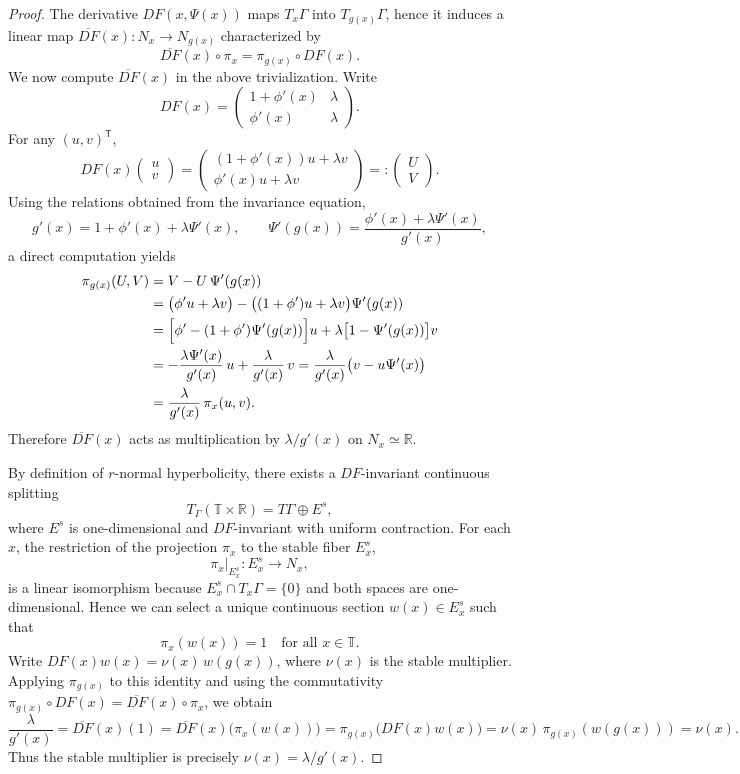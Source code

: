 \documentclass{amsart}
\begin{document}
\begin{proof}
The derivative $DF(x,\Psi(x))$ maps $T_x\Gamma$ into $T_{g(x)}\Gamma$,
hence it induces a linear map $\overline{DF}(x): N_x \to N_{g(x)}$ characterized by
\[
\overline{DF}(x) \circ \pi_x = \pi_{g(x)} \circ DF(x).
\]
We now compute $\overline{DF}(x)$ in the above trivialization.  Write
\[
DF(x) = \begin{pmatrix}
1+\phi'(x) & \lambda \\
\phi'(x)   & \lambda
\end{pmatrix}.
\]
For any $(u,v)^{\mathsf{T}}$,
\[
DF(x)\begin{pmatrix}u\\ v\end{pmatrix}
= \begin{pmatrix}
(1+\phi'(x))u + \lambda v \\
\phi'(x)u + \lambda v
\end{pmatrix}
=: \begin{pmatrix} U \\ V \end{pmatrix}.
\]
Using the relations obtained from the invariance equation,
\[
g'(x) = 1+\phi'(x)+\lambda\Psi'(x),\qquad
\Psi'(g(x)) = \frac{\phi'(x)+\lambda\Psi'(x)}{g'(x)},
\]
a direct computation yields
\begin{align*}
\pi_{g(x)}(U,V) &= V - U\,\Psi'(g(x)) \\
&= \bigl(\phi'u+\lambda v\bigr) - \bigl((1+\phi')u+\lambda v\bigr)\Psi'(g(x)) \\
&= \Bigl[\phi' - (1+\phi')\Psi'(g(x))\Bigr]u + \lambda\bigl[1-\Psi'(g(x))\bigr]v \\
&= -\frac{\lambda\Psi'(x)}{g'(x)}\,u + \frac{\lambda}{g'(x)}\,v
 = \frac{\lambda}{g'(x)}\bigl(v-u\Psi'(x)\bigr) \\
&= \frac{\lambda}{g'(x)}\,\pi_x(u,v).
\end{align*}
Therefore $\overline{DF}(x)$ acts as multiplication by $\lambda/g'(x)$ on $N_x\simeq\mathbb{R}$.

\medskip

By definition of $r$-normal hyperbolicity, there exists a $DF$-invariant continuous splitting
\[
T_\Gamma(\mathbb{T}\times\mathbb{R}) = T\Gamma \oplus E^s,
\]
where $E^s$ is one-dimensional and $DF$-invariant with uniform contraction.  For each $x$,
the restriction of the projection $\pi_x$ to the stable fiber $E^s_x$,
\[
\pi_x|_{E^s_x} : E^s_x \longrightarrow N_x,
\]
is a linear isomorphism because $E^s_x \cap T_x\Gamma = \{0\}$ and both spaces are
one-dimensional.  Hence we can select a unique continuous section $w(x)\in E^s_x$ such that
\[
\pi_x(w(x)) = 1 \quad \text{for all } x\in\mathbb{T}.
\]
Write $DF(x)w(x) = \nu(x)\, w(g(x))$, where $\nu(x)$ is the stable multiplier.
Applying $\pi_{g(x)}$ to this identity and using the commutativity
$\pi_{g(x)}\circ DF(x) = \overline{DF}(x)\circ\pi_x$, we obtain
\[
\frac{\lambda}{g'(x)} = \overline{DF}(x)(1)
= \overline{DF}(x)\bigl(\pi_x(w(x))\bigr)
= \pi_{g(x)}\bigl(DF(x)w(x)\bigr)
= \nu(x)\,\pi_{g(x)}(w(g(x)))
= \nu(x).
\]
Thus the stable multiplier is precisely $\nu(x)=\lambda/g'(x)$.


\end{proof}
\end{document}
